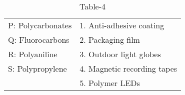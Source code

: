 \begin{table}[htbp]
\centering
\caption{Table-4}
\label{tab:tables/table4.tex}

\begin{tabular}{l l}
P: Polycarbonates & 1. Anti-adhesive coating \\
Q: Fluorocarbons & 2. Packaging film \\
R: Polyaniline & 3. Outdoor light globes \\
S: Polypropylene & 4. Magnetic recording tapes \\
& 5. Polymer LEDs \\
\end{tabular}

\end{table}